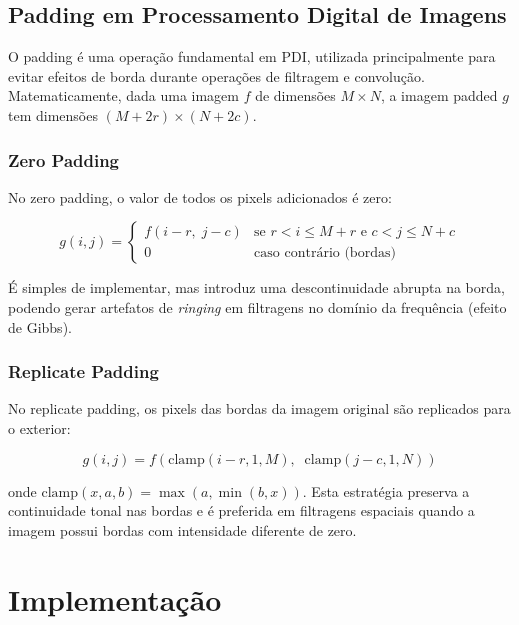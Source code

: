 \documentclass[12pt,a4paper]{article}
\begin{document}
\subsection{Padding em Processamento Digital de Imagens}

O padding é uma operação fundamental em PDI, utilizada principalmente para
evitar efeitos de borda durante operações de filtragem e convolução.
Matematicamente, dada uma imagem $f$ de dimensões $M \times N$, a imagem
padded $g$ tem dimensões $(M+2r) \times (N+2c)$.

\subsubsection{Zero Padding}

No zero padding, o valor de todos os pixels adicionados é zero:

\begin{equation}
  g(i, j) = \begin{cases}
    f(i-r,\; j-c) & \text{se } r < i \leq M+r \text{ e } c < j \leq N+c \\
    0              & \text{caso contrário (bordas)}
  \end{cases}
\end{equation}

É simples de implementar, mas introduz uma descontinuidade abrupta na borda,
podendo gerar artefatos de \emph{ringing} em filtragens no domínio da
frequência (efeito de Gibbs).

\subsubsection{Replicate Padding}

No replicate padding, os pixels das bordas da imagem original são replicados
para o exterior:

\begin{equation}
  g(i, j) = f\!\left(\text{clamp}(i-r, 1, M),\;\; \text{clamp}(j-c, 1, N)\right)
\end{equation}

onde $\text{clamp}(x, a, b) = \max(a, \min(b, x))$.  Esta estratégia preserva
a continuidade tonal nas bordas e é preferida em filtragens espaciais quando
a imagem possui bordas com intensidade diferente de zero.

\section{Implementação}
\end{document}
